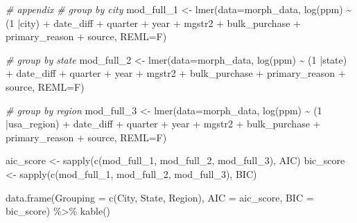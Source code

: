 \documentclass[
  11pt,
]{article}
\newenvironment{Shaded}{\begin{snugshade}}{\end{snugshade}}
\newcommand{\AttributeTok}[1]{\textcolor[rgb]{0.77,0.63,0.00}{#1}}
\newcommand{\CommentTok}[1]{\textcolor[rgb]{0.56,0.35,0.01}{\textit{#1}}}
\newcommand{\DecValTok}[1]{\textcolor[rgb]{0.00,0.00,0.81}{#1}}
\newcommand{\FunctionTok}[1]{\textcolor[rgb]{0.00,0.00,0.00}{#1}}
\newcommand{\NormalTok}[1]{#1}
\newcommand{\OtherTok}[1]{\textcolor[rgb]{0.56,0.35,0.01}{#1}}
\newcommand{\SpecialCharTok}[1]{\textcolor[rgb]{0.00,0.00,0.00}{#1}}
\newcommand{\StringTok}[1]{\textcolor[rgb]{0.31,0.60,0.02}{#1}}
\begin{document}
\begin{Shaded}
\begin{Highlighting}[]
\CommentTok{\# appendix}
\CommentTok{\# group by city}
\NormalTok{mod\_full\_1 }\OtherTok{\textless{}{-}} \FunctionTok{lmer}\NormalTok{(}\AttributeTok{data=}\NormalTok{morph\_data, }\FunctionTok{log}\NormalTok{(ppm) }\SpecialCharTok{\textasciitilde{}}\NormalTok{ (}\DecValTok{1} \SpecialCharTok{|}\NormalTok{city) }\SpecialCharTok{+}\NormalTok{ date\_diff }\SpecialCharTok{+}\NormalTok{ quarter }\SpecialCharTok{+}\NormalTok{ year }\SpecialCharTok{+}\NormalTok{ mgstr2 }\SpecialCharTok{+}
\NormalTok{                bulk\_purchase }\SpecialCharTok{+}\NormalTok{ primary\_reason }\SpecialCharTok{+}\NormalTok{ source, }\AttributeTok{REML=}\NormalTok{F)}

\CommentTok{\# group by state}
\NormalTok{mod\_full\_2 }\OtherTok{\textless{}{-}} \FunctionTok{lmer}\NormalTok{(}\AttributeTok{data=}\NormalTok{morph\_data, }\FunctionTok{log}\NormalTok{(ppm) }\SpecialCharTok{\textasciitilde{}}\NormalTok{ (}\DecValTok{1} \SpecialCharTok{|}\NormalTok{state) }\SpecialCharTok{+}\NormalTok{ date\_diff }\SpecialCharTok{+}\NormalTok{ quarter }\SpecialCharTok{+}\NormalTok{ year }\SpecialCharTok{+}\NormalTok{ mgstr2 }\SpecialCharTok{+}
\NormalTok{                bulk\_purchase }\SpecialCharTok{+}\NormalTok{ primary\_reason }\SpecialCharTok{+}\NormalTok{ source, }\AttributeTok{REML=}\NormalTok{F)}

\CommentTok{\# group by region}
\NormalTok{mod\_full\_3 }\OtherTok{\textless{}{-}} \FunctionTok{lmer}\NormalTok{(}\AttributeTok{data=}\NormalTok{morph\_data, }\FunctionTok{log}\NormalTok{(ppm) }\SpecialCharTok{\textasciitilde{}}\NormalTok{ (}\DecValTok{1} \SpecialCharTok{|}\NormalTok{usa\_region) }\SpecialCharTok{+}\NormalTok{ date\_diff }\SpecialCharTok{+}\NormalTok{ quarter }\SpecialCharTok{+}\NormalTok{ year }\SpecialCharTok{+}\NormalTok{ mgstr2 }\SpecialCharTok{+}
\NormalTok{                bulk\_purchase }\SpecialCharTok{+}\NormalTok{ primary\_reason }\SpecialCharTok{+}\NormalTok{ source, }\AttributeTok{REML=}\NormalTok{F)}

\NormalTok{aic\_score }\OtherTok{\textless{}{-}} \FunctionTok{sapply}\NormalTok{(}\FunctionTok{c}\NormalTok{(mod\_full\_1, mod\_full\_2, mod\_full\_3), AIC)}
\NormalTok{bic\_score }\OtherTok{\textless{}{-}} \FunctionTok{sapply}\NormalTok{(}\FunctionTok{c}\NormalTok{(mod\_full\_1, mod\_full\_2, mod\_full\_3), BIC)}

\FunctionTok{data.frame}\NormalTok{(}\StringTok{\textquotesingle{}Grouping\textquotesingle{}} \OtherTok{=} \FunctionTok{c}\NormalTok{(}\StringTok{\textquotesingle{}City\textquotesingle{}}\NormalTok{, }\StringTok{\textquotesingle{}State\textquotesingle{}}\NormalTok{, }\StringTok{\textquotesingle{}Region\textquotesingle{}}\NormalTok{), }\StringTok{\textquotesingle{}AIC\textquotesingle{}} \OtherTok{=}\NormalTok{ aic\_score, }\StringTok{\textquotesingle{}BIC\textquotesingle{}} \OtherTok{=}\NormalTok{ bic\_score) }\SpecialCharTok{\%\textgreater{}\%}
  \FunctionTok{kable}\NormalTok{()}
\end{Highlighting}
\end{Shaded}
\end{document}
